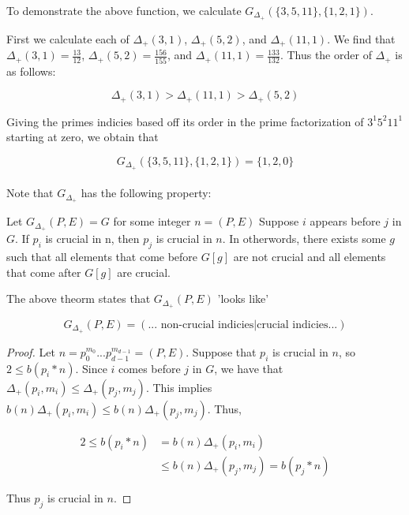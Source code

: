 \documentclass[../paper.tex]{subfiles}
\begin{document}
To demonstrate the above function, we calculate 
$G_{\Delta_{+}}(\{3,5,11\}, \{1,2,1\})$.

First we calculate each of $\Delta_{+}(3,1)$, $\Delta_{+}(5,2)$, 
and $\Delta_{+}(11,1)$. We find that 
$\Delta_{+}(3,1) = \frac{13}{12}$,
$\Delta_{+}(5,2) = \frac{156}{155}$, and
$\Delta_{+}(11,1)= \frac{133}{132}$.
Thus the order of $\Delta_{+}$ is as follows:

$$ \Delta_{+}(3,1) > \Delta_{+}(11,1) > \Delta_{+}(5,2)$$

Giving the primes indicies based off its order in the prime
factorization of $3^1 5^2 11^1$ starting at zero, we obtain that

$$G_{\Delta_{+}}(\{3,5,11\}, \{1,2,1\}) = \{1,2,0\}$$
\\

Note that $G_{\Delta_+}$ has the following property:

\begin{theorem}\label{crucial_thm}
Let $G_{\Delta_+}(P,E) = G$ for some integer $n = (P,E)$
Suppose $i$ appears before $j$ in $G$. If $p_i$ is crucial in n,
then $p_j$ is crucial in $n$. In otherwords, there exists some $g$
such that all elements that come before $G[g]$ are not crucial and
all elements that come after $G[g]$ are crucial.
\end{theorem}

The above theorm states that $G_{\Delta_+}(P,E)$ 'looks like'

$$ G_{\Delta_+}(P, E) = (\text{... non-crucial indicies} 
                        | \text{crucial indicies...}) $$

\begin{proof}

Let $n = p_0^{m_0} ... p_{d-1}^{m_{d-1}} = (P, E)$. Suppose that
$p_i$ is crucial in $n$, so $2 \leq b(p_i * n)$. Since $i$ comes
before $j$ in $G$, we have that $\Delta_+(p_i, m_i) \leq 
\Delta_+(p_j, m_j)$. This implies $b(n)\Delta_+(p_i, m_i) \leq
b(n)\Delta_+(p_j, m_j)$. Thus,

\begin{equation}
\begin{split}
2 \leq b(p_i * n) & = b(n)\Delta_+(p_i, m_i) \\
               & \leq b(n)\Delta_+(p_j, m_j) = b(p_j * n)
\end{split}
\end{equation}

Thus $p_j$ is crucial in $n$.

\end{proof}
\end{document}
